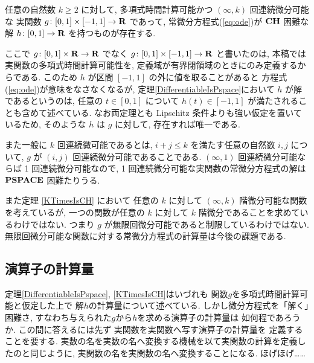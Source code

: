  \begin{theorem}
  \label{KTimesIsCH}
  任意の自然数 $k \ge 2$ に対して, 
  多項式時間計算可能かつ $(\infty, k)$ 回連続微分可能な
  実関数 $g \colon [0,1] \times [-1,1] \to \mathbf R$ であって, 
  常微分方程式(\ref{eq:ode})が
  $\mathbf{CH}$ 困難な解 $h \colon [0, 1] \to \mathbf R$ を持つものが存在する.
 \end{theorem}

ここで $g \colon [0,1] \times \mathbf R \to \mathbf R$ でなく
$g \colon [0,1] \times [-1, 1] \to \mathbf R$ と書いたのは, 
本稿では実関数の多項式時間計算可能性を, 
定義域が有界閉領域のときにのみ定義するからである. 
このため $h$ が区間 $[-1, 1]$ の外に値を取ることがあると
方程式(\ref{eq:ode})が意味をなさなくなるが, 
定理\ref{DifferentiableIsPspace}において $h$ が解であるというのは, 
任意の $t \in [0, 1]$ について $h (t) \in [-1, 1]$ が満たされることも含めて述べている.
なお両定理とも Lipschitz 条件よりも強い仮定を置いているため, 
そのような $h$ は $g$ に対して, 存在すれば唯一である. 

また一般に $k$ 回連続微可能であるとは, 
$i+j \le k$ を満たす任意の自然数 $i,j$ について,
$g$ が $(i,j)$ 回連続微分可能であることである.
$(\infty, 1)$ 回連続微分可能ならば 1 回連続微分可能なので,
1 回連続微分可能な実関数の常微分方程式の解は $\mathbf{PSPACE}$ 困難たりうる.

 また定理 \ref{KTimesIsCH} において
 任意の $k$ に対して $(\infty, k)$ 階微分可能な関数を考えているが,
 一つの関数が任意の $k$ に対して $k$ 階微分であることを求めているわけではない.
 つまり $g$ が無限回微分可能であると制限しているわけではない. 
 無限回微分可能な関数に対する常微分方程式の計算量は今後の課題である.


\subsection{演算子の計算量}

定理\ref{DifferentiableIsPspace}, 
\ref{KTimesIsCH}はいづれも
関数$g$を多項式時間計算可能と仮定した上で
解$h$の計算量について述べている. 
しかし微分方程式を「解く」困難さ, 
すなわち与えられた$g$から$h$を求める演算子の計算量は
如何程であろうか. 
この問に答えるには先ず
実関数を実関数へ写す演算子の計算量を
定義することを要する. 
実数の名を実数の名へ変換する機械を以て実関数の計算を定義したのと同じように, 
実関数の名を実関数の名へ変換することになる. 
ほげほげ……

\newcommand{\OpDiffIVP}{\mathit{ODE}}
\newcommand{\deltabox}{\delta _\square}
\newcommand{\classtwofont}[1]{\text{\bfseries \sffamily \upshape #1}}
\newcommand{\classFPSPACEtwo}{\classtwofont{FPSPACE}}
\newcommand{\classCHtwo}{\classtwofont{CH}}
\newcommand{\redW}{\leq _{\mathrm W}}
\newcommand{\redSW}{\leq _{\mathrm{sW}}}

